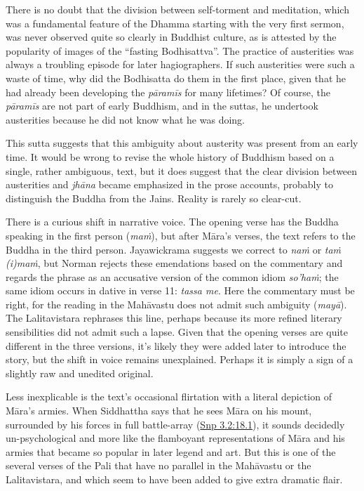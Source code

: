 \documentclass[12pt,openany]{book}%
\begin{document}
There is no doubt that the division between self-torment and meditation, which was a fundamental feature of the Dhamma starting with the very first sermon, was never observed quite so clearly in Buddhist culture, as is attested by the popularity of images of the “fasting Bodhisattva”. The practice of austerities was always a troubling episode for later hagiographers. If such austerities were such a waste of time, why did the Bodhisatta do them in the first place, given that he had already been developing the \textit{\textsanskrit{pāramīs}} for many lifetimes? Of course, the \textit{\textsanskrit{pāramīs}} are not part of early Buddhism, and in the suttas, he undertook austerities because he did not know what he was doing.

This sutta suggests that this ambiguity about austerity was present from an early time. It would be wrong to revise the whole history of Buddhism based on a single, rather ambiguous, text, but it does suggest that the clear division between austerities and \textit{\textsanskrit{jhāna}} became emphasized in the prose accounts, probably to distinguish the Buddha from the Jains. Reality is rarely so clear-cut.

There is a curious shift in narrative voice. The opening verse has the Buddha speaking in the first person (\textit{\textsanskrit{maṁ}}), but after \textsanskrit{Māra}’s verses, the text refers to the Buddha in the third person. Jayawickrama suggests we correct to \textit{\textsanskrit{naṁ}} or \textit{\textsanskrit{taṁ} (i)\textsanskrit{maṁ}}, but Norman rejects these emendations based on the commentary and regards the phrase as an accusative version of the common idiom \textit{so’\textsanskrit{haṁ}}; the same idiom occurs in dative in verse 11: \textit{tassa me}. Here the commentary must be right, for the reading in the \textsanskrit{Mahāvastu} does not admit such ambiguity (\textit{\textsanskrit{mayā}}). The Lalitavistara rephrases this line, perhaps because its more refined literary sensibilities did not admit such a lapse. Given that the opening verses are quite different in the three versions, it’s likely they were added later to introduce the story, but the shift in voice remains unexplained. Perhaps it is simply a sign of a slightly raw and unedited original.

Less inexplicable is the text’s occasional flirtation with a literal depiction of \textsanskrit{Māra}’s armies. When Siddhattha says that he sees \textsanskrit{Māra} on his mount, surrounded by his forces in full battle-array (\href{https://suttacentral.net/snp3.2/en/sujato\#18.1}{Snp 3.2:18.1}), it sounds decidedly un-psychological and more like the flamboyant representations of \textsanskrit{Māra} and his armies that became so popular in later legend and art. But this is one of the several verses of the Pali that have no parallel in the \textsanskrit{Mahāvastu} or the Lalitavistara, and which seem to have been added to give extra dramatic flair.
\end{document}

